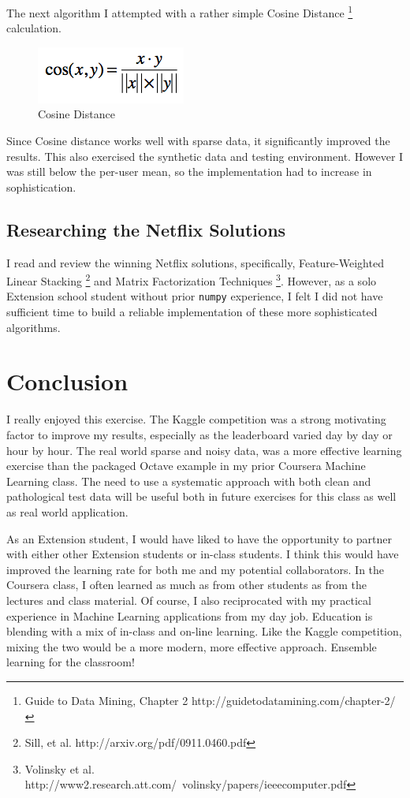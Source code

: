 \documentclass[11pt, oneside]{article}   	%
\begin{document}
The next algorithm I attempted with a rather simple Cosine Distance \footnote{Guide to Data Mining, Chapter 2 http://guidetodatamining.com/chapter-2/}
calculation.
\begin{figure}[h!]
\centering
\includegraphics[scale=0.8]{cosine}
\caption{Cosine Distance}
\end{figure}

Since Cosine distance works well with sparse data, it significantly improved the results. This also exercised the synthetic data and testing environment. However I was still below the per-user mean, so the implementation had to increase in sophistication.

\subsection*{Researching the Netflix Solutions}

I read and review the winning Netflix solutions, specifically, Feature-Weighted Linear Stacking \footnote{Sill, et al. http://arxiv.org/pdf/0911.0460.pdf} and Matrix Factorization Techniques \footnote{Volinsky et al. http://www2.research.att.com/~volinsky/papers/ieeecomputer.pdf}. However, as a solo Extension school student without prior \texttt{numpy} experience, I felt I did not have sufficient time to build a reliable implementation of these more sophisticated algorithms. 

\section*{Conclusion}

I really enjoyed this exercise. The Kaggle competition was a strong motivating factor to improve my results, especially as the leaderboard varied day by day or hour by hour. The real world sparse and noisy data, was a more effective learning exercise than the packaged Octave example in my prior Coursera Machine Learning class. The need to use a systematic approach with both clean and pathological test data will be useful both in future exercises for this class as well as real world application.

As an Extension student, I would have liked to have the opportunity to partner with either other Extension students or in-class students. I think this would have improved the learning rate for both me and my potential collaborators. In the Coursera class, I often learned as much as from other students as from the lectures and class material. Of course, I also reciprocated with my practical experience in Machine Learning applications from my day job. Education is blending with a mix of in-class and on-line learning. Like the Kaggle competition, mixing the two would be a more modern, more effective approach. Ensemble learning for the classroom!
\end{document}
